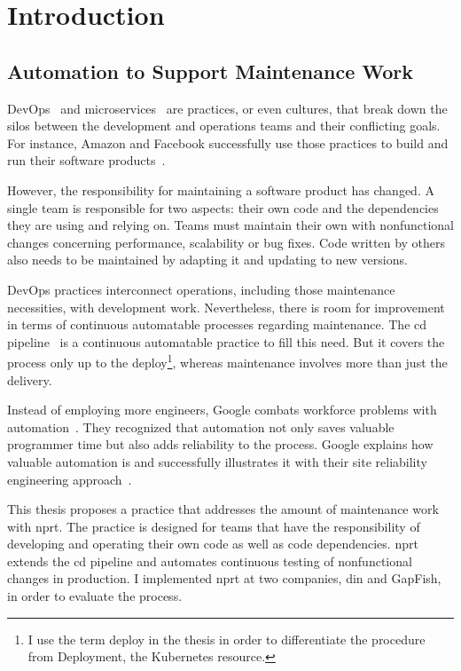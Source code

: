 \chapter{Introduction}
\label{chap:intro}
\section{Automation to Support Maintenance Work}

DevOps~\cite{devops_definition} and microservices~\cite{microservices_fowler} are
practices, or even cultures, that break down the silos between the development and
operations teams and their conflicting goals. For instance, Amazon and Facebook successfully
use those practices to build and run their software products~\cite{build_run,dev_at_fb}.

However, the responsibility for maintaining a software product has changed. A single team is
responsible for two aspects: their own code and the dependencies they are using and relying
on. Teams must maintain their own with nonfunctional changes
concerning performance, scalability or bug fixes. Code written by others also needs to be
maintained by adapting it and updating to new versions.

DevOps practices interconnect operations, including those maintenance necessities, with
development work. Nevertheless, there is room for improvement in terms of continuous
automatable processes regarding maintenance. The \gls{cd}
pipeline~\cite{cd_humble_pipeline} is a continuous automatable practice to fill this
need. But it covers the process only up to the deploy\footnote{I use the term deploy in
  the thesis in order to differentiate the procedure from Deployment, the Kubernetes
  resource.}, whereas maintenance involves more than just the delivery.

Instead of employing more engineers, Google combats workforce problems with
automation~\cite{sre_automation}. They recognized that automation not only saves
valuable programmer time but also adds reliability to the process. Google explains
how valuable automation is and successfully illustrates it with their site reliability
engineering approach~\cite{sre_intro}.

This thesis proposes a practice that addresses the amount of maintenance
work with \gls{nprt}. The practice is designed for teams that have the responsibility of developing and
operating their own code as well as code dependencies. \gls{nprt} extends the \gls{cd}
pipeline and automates continuous testing of nonfunctional changes in production. I
implemented \gls{nprt} at two companies, \gls{din} and GapFish, in order to
evaluate the process.

